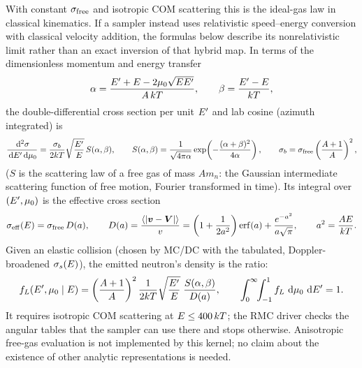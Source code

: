 \documentclass[11pt]{article}
\begin{document}
With constant $\sigma_{\rm free}$ and isotropic COM scattering this is the ideal-gas
law in classical kinematics. If a sampler instead uses relativistic speed--energy
conversion with classical velocity addition, the formulas below describe its
nonrelativistic limit rather than an exact inversion of that hybrid map.
In terms of the dimensionless momentum and energy transfer
\begin{equation}
  \alpha = \frac{E' + E - 2\mu_0\sqrt{EE'}}{A\,kT},\qquad
  \beta = \frac{E' - E}{kT},
\end{equation}
the double-differential cross section per unit $E'$ and lab cosine (azimuth
integrated) is
\begin{equation}
  \frac{\,\mathrm{d}^2\sigma}{\,\mathrm{d}E'\,\mathrm{d}\mu_0} = \frac{\sigma_b}{2kT}\sqrt{\frac{E'}{E}}\,
  S(\alpha,\beta),\qquad
  S(\alpha,\beta) = \frac{1}{\sqrt{4\pi\alpha}}\exp\!\left(-\frac{(\alpha+\beta)^2}{4\alpha}\right),
  \qquad \sigma_b = \sigma_{\rm free}\left(\frac{A+1}{A}\right)^2 ,
\end{equation}
($S$ is the scattering law of a free gas of mass $A m_n$: the Gaussian intermediate
scattering function of free motion, Fourier transformed in time). Its integral over
$(E', \mu_0)$ is the effective cross section
\begin{equation}
  \sigma_{\rm eff}(E) = \sigma_{\rm free}\,D(a),\qquad
  D(a) = \frac{\langle|\bm v - \bm V|\rangle}{v}
  = \left(1 + \frac{1}{2a^2}\right)\operatorname{erf}(a) + \frac{e^{-a^2}}{a\sqrt\pi},
  \qquad a^2 = \frac{AE}{kT}.
\end{equation}
Given an elastic collision (chosen by MC/DC with the tabulated, Doppler-broadened
$\sigma_s(E)$), the emitted neutron's density is the ratio:
\begin{equation}
  f_L(E', \mu_0 \mid E) = \left(\frac{A+1}{A}\right)^2
  \frac{1}{2kT}\sqrt{\frac{E'}{E}}\;\frac{S(\alpha,\beta)}{D(a)} ,
  \qquad \int_0^\infty\!\!\int_{-1}^1 f_L\,\,\mathrm{d}\mu_0\,\,\mathrm{d}E' = 1 .
\end{equation}
It requires isotropic COM scattering at $E \le 400\,kT$; the RMC driver checks the
angular tables that the sampler can use there and stops otherwise. Anisotropic
free-gas evaluation is not implemented by this kernel; no claim about the
existence of other analytic representations is needed.
\end{document}
